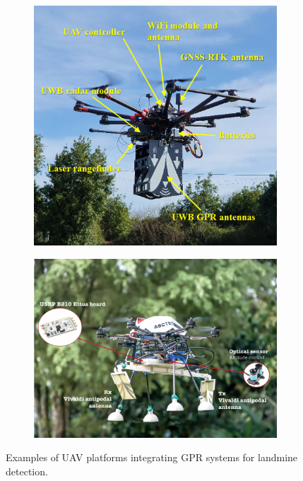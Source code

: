\begin{figure}[h!]
    \centering
    \begin{subfigure}[b]{0.48\linewidth}
        \centering
        \includegraphics[width=\linewidth]{figs/Huirui/gpr_drone1.png}
        \label{fig:gpr_drone1}
    \end{subfigure}
    \hfill
    \begin{subfigure}[b]{0.48\linewidth}
        \centering
        \includegraphics[width=\linewidth]{figs/Huirui/gpr_drone2.png}
        \label{fig:gpr_drone2}
    \end{subfigure}
    \caption{Examples of UAV platforms integrating GPR systems for landmine detection.~\cite{garcia2022safedrone,cerquera2017uav}}
    \label{fig:gpr_uav_examples}
\end{figure}
